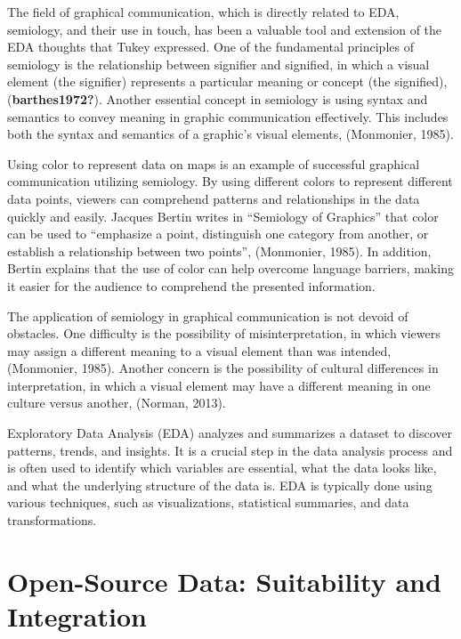 \documentclass[print]{nuthesis}
\begin{document}
The field of graphical communication, which is directly related to EDA, semiology, and their use in touch, has been a valuable tool and extension of the EDA thoughts that Tukey expressed.
One of the fundamental principles of semiology is the relationship between signifier and signified, in which a visual element (the signifier) represents a particular meaning or concept (the signified), (\textbf{barthes1972?}).
Another essential concept in semiology is using syntax and semantics to convey meaning in graphic communication effectively.
This includes both the syntax and semantics of a graphic's visual elements, (Monmonier, 1985).

Using color to represent data on maps is an example of successful graphical communication utilizing semiology.
By using different colors to represent different data points, viewers can comprehend patterns and relationships in the data quickly and easily.
Jacques Bertin writes in ``Semiology of Graphics'' that color can be used to ``emphasize a point, distinguish one category from another, or establish a relationship between two points'', (Monmonier, 1985).
In addition, Bertin explains that the use of color can help overcome language barriers, making it easier for the audience to comprehend the presented information.

The application of semiology in graphical communication is not devoid of obstacles.
One difficulty is the possibility of misinterpretation, in which viewers may assign a different meaning to a visual element than was intended, (Monmonier, 1985).
Another concern is the possibility of cultural differences in interpretation, in which a visual element may have a different meaning in one culture versus another, (Norman, 2013).

Exploratory Data Analysis (EDA) analyzes and summarizes a dataset to discover patterns, trends, and insights.
It is a crucial step in the data analysis process and is often used to identify which variables are essential, what the data looks like, and what the underlying structure of the data is.
EDA is typically done using various techniques, such as visualizations, statistical summaries, and data transformations.

\hypertarget{open-source-data-suitability-and-integration}{%
\section{Open-Source Data: Suitability and Integration}\label{open-source-data-suitability-and-integration}}
\end{document}

